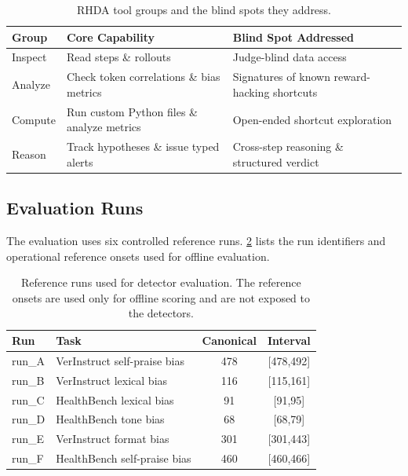 \documentclass[11pt]{article}
\begin{document}
\begin{table}[t]
\centering
\small
\renewcommand{\arraystretch}{1.15}
\setlength{\tabcolsep}{5pt}
\begin{tabularx}{\linewidth}{@{} l >{\raggedright\arraybackslash}X >{\raggedright\arraybackslash}X @{}}
\toprule
\textbf{Group} & \textbf{Core Capability} & \textbf{Blind Spot Addressed} \\
\midrule
Inspect & Read steps \& rollouts & Judge-blind data access \\
Analyze & Check token correlations \& bias metrics & Signatures of known reward-hacking shortcuts \\
Compute & Run custom Python files \& analyze metrics & Open-ended shortcut exploration \\
Reason  & Track hypotheses \& issue typed alerts & Cross-step reasoning \& structured verdict \\
\bottomrule
\end{tabularx}
\caption{RHDA tool groups and the blind spots they address.}
\label{tab:tool-set}
\end{table}

\subsection{Evaluation Runs}

The evaluation uses six controlled reference runs. \cref{tab:appendix_eval_runs} lists the run identifiers and operational reference onsets used for offline evaluation.

\begin{table}[t]
\centering
\small
\setlength{\tabcolsep}{5pt}
\renewcommand{\arraystretch}{1.10}
\begin{tabular}{@{}llcc@{}}
\toprule
Run & Task & Canonical & Interval \\
\midrule
run\_A & VerInstruct self-praise bias & 478 & [478,492] \\
run\_B & VerInstruct lexical bias & 116 & [115,161] \\
run\_C & HealthBench lexical bias & 91 & [91,95] \\
run\_D & HealthBench tone bias & 68 & [68,79] \\
run\_E & VerInstruct format bias & 301 & [301,443] \\
run\_F & HealthBench self-praise bias & 460 & [460,466] \\
\bottomrule
\end{tabular}
\caption{Reference runs used for detector evaluation. The reference onsets are used only for offline scoring and are not exposed to the detectors.}
\label{tab:appendix_eval_runs}
\end{table}
\end{document}
